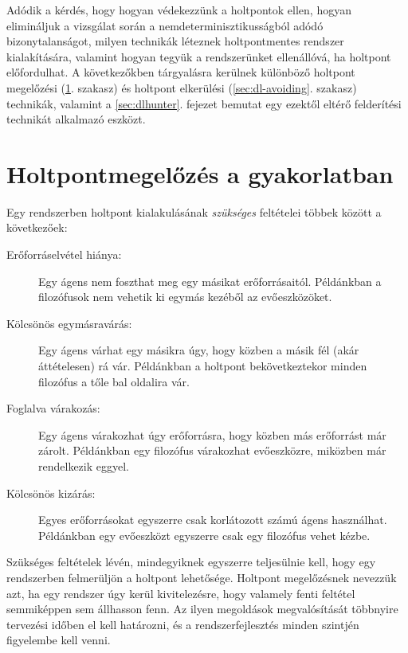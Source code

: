     Adódik a kérdés, hogy hogyan védekezzünk a holtpontok ellen, hogyan elimináljuk a vizsgálat során a nemdeterminisztikusságból adódó bizonytalanságot, milyen technikák léteznek holtpontmentes rendszer kialakítására, valamint hogyan tegyük a rendszerünket ellenállóvá, ha holtpont előfordulhat. A következőkben tárgyalásra kerülnek különböző holtpont megelőzési (\ref{sec:dl-prevention}. szakasz) és holtpont elkerülési (\ref{sec:dl-avoiding}. szakasz) technikák, valamint a \ref{sec:dlhunter}. fejezet bemutat egy ezektől eltérő felderítési technikát alkalmazó eszközt.

\section{Holtpontmegelőzés a gyakorlatban} 
\label{sec:dl-prevention}
    Egy rendszerben holtpont kialakulásának \emph{szükséges} feltételei többek között a következőek:
    
    \begin{description}
    \item[Erőforráselvétel hiánya:] Egy ágens nem foszthat meg egy másikat erőforrásaitól. Példánkban a filozófusok nem vehetik ki egymás kezéből az evőeszközöket.
    \item[Kölcsönös egymásravárás:] Egy ágens várhat egy másikra úgy, hogy közben a másik fél (akár áttételesen) rá vár. Példánkban a holtpont bekövetkeztekor minden filozófus a tőle bal oldalira vár.
    \item[Foglalva várakozás:] Egy ágens várakozhat úgy erőforrásra, hogy közben más erőforrást már zárolt. Példánkban egy filozófus várakozhat evőeszközre, miközben már rendelkezik eggyel.
    \item[Kölcsönös kizárás:] Egyes erőforrásokat egyszerre csak korlátozott számú ágens használhat. Példánkban egy evőeszközt egyszerre csak egy filozófus vehet kézbe.
    \end{description}
%    
    Szükséges feltételek lévén, mindegyiknek egyszerre teljesülnie kell, hogy egy rendszerben felmerüljön a holtpont lehetősége. Holtpont megelőzésnek nevezzük azt, ha egy rendszer úgy kerül kivitelezésre, hogy valamely fenti feltétel semmiképpen sem állhasson fenn. Az ilyen megoldások megvalósítását többnyire tervezési időben el kell határozni, és a rendszerfejlesztés minden szintjén figyelembe kell venni.
    
